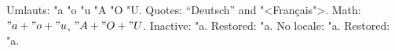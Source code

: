 \documentclass{article}
\begin{document}
Umlauts: "a "o "u "A "O "U.
Quotes: "`Deutsch"' and "<Fran\c cais">.
Math: $"a+"o+"u$, $"A+"O+"U$.
{Inactive: "a.} Restored: "a.
{No locale: "a.} Restored: "a.
\end{document}
